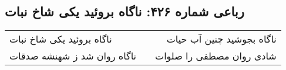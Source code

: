\begin{center}
\section*{رباعی شماره ۴۲۶: ناگاه بروئید یکی شاخ نبات}
\label{sec:0426}
\begin{longtable}{l p{0.5cm} r}
ناگاه بروئید یکی شاخ نبات
&&
ناگاه بجوشید چنین آب حیات
\\
ناگاه روان شد ز شهنشه صدقات
&&
شادی روان مصطفی را صلوات
\\
\end{longtable}
\end{center}
